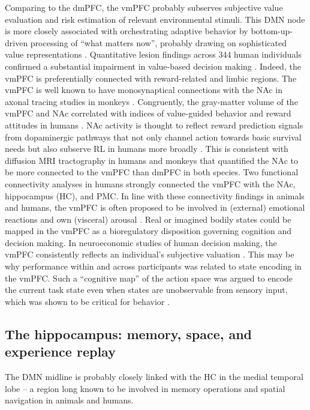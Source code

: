 \documentclass[10pt,letterpaper]{article}
\begin{document}
Comparing to the dmPFC,
the vmPFC probably subserves
subjective value evaluation and
risk estimation of relevant environmental stimuli.
This DMN node is more closely associated with
orchestrating adaptive behavior by bottom-up-driven
processing of “what matters now”,
probably drawing on sophisticated value representations
\citep{doherty2015structure}.
Quantitative lesion findings across 344 human individuals confirmed
a substantial impairment in value-based decision making
\citep{glascher2012lesion}.
Indeed,
the vmPFC is preferentially connected with reward-related and limbic regions.
The vmPFC is well known to have monosynaptical connections
with the NAc
in axonal tracing studies in monkeys \citep{haber1995orbital}.
Congruently, the gray-matter volume of the vmPFC and NAc
correlated with indices of value-guided behavior and reward attitudes
in humans
\citep{lebreton2009automatic}.
NAc activity is thought to reflect reward prediction signals from dopaminergic pathways
\citep{schultz1998predictive}
that not only channel action towards basic survival needs but also
subserve RL in humans more broadly \citep{doherty2015structure}.
This is consistent with diffusion MRI tractography in humans and monkeys
\citep{croxson2005quantitative} that
quantified the NAc to
be more connected to the vmPFC than dmPFC in both species.
Two functional connectivity analyses in humans strongly connected
the vmPFC with the NAc, hippocampus (HC),
and PMC.
%
In line with these connectivity findings in animals and humans,
the vmPFC is often proposed to be involved in (external) emotional
reactions and own (visceral) arousal \citep{damasio1996somatic}.
Real or imagined bodily states could be mapped in the vmPFC
as a bioregulatory disposition governing cognition
and decision making.
In neuroeconomic studies of human decision making,
the vmPFC consistently reflects an individual’s subjective
valuation
\citep{behrens2008associative}.
This may be why performance within and across participants
was related to state encoding in the vmPFC.
Such a ``cognitive map'' of the action space was argued to encode
the current task state even when states are unobservable from sensory input,
which was shown to be critical for behavior \citep{Schuck2016}.



\subsection{The hippocampus: memory, space, and experience replay}
The DMN midline is probably closely linked
with the HC in the medial temporal lobe \citep{vincet2006} --
a region long known to be involved in
memory operations and spatial navigation in animals and humans.
\end{document}
